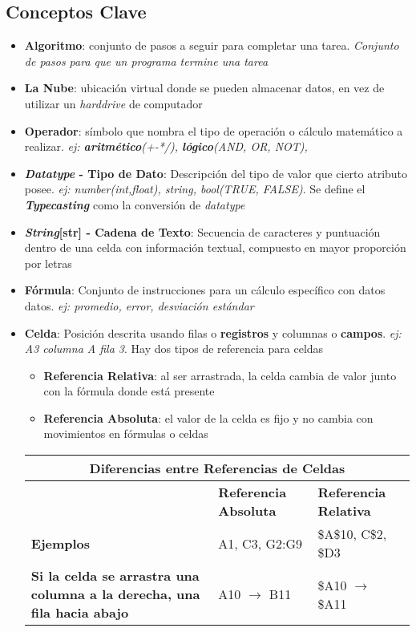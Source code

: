 \subsection{Conceptos Clave}
\begin{itemize}
    \item {\textbf{Algoritmo}: conjunto de pasos a seguir para completar una tarea. \textit{Conjunto de pasos para que un programa termine una tarea}}
    \item {\textbf{La Nube}: ubicación virtual donde se pueden almacenar datos, en vez de utilizar un \textit{harddrive} de computador}
    \item {\textbf{Operador}: símbolo que nombra el tipo de operación o cálculo matemático a realizar. \textit{ej: \textbf{aritmético}(+-*/), \textbf{lógico}(AND, OR, NOT), }}
    \item {\textbf{\textit{Datatype} - Tipo de Dato}: Descripción del tipo de valor que cierto atributo posee. \textit{ej: number(int,float), string, bool(TRUE, FALSE)}. Se define el \textbf{\textit{Typecasting}} como la conversión de \textit{datatype}}
    \item {\textbf{\textit{String}[str] - Cadena de Texto}: Secuencia de caracteres y puntuación dentro de una celda con información textual, compuesto en mayor proporción por letras}
    \item {\textbf{Fórmula}: Conjunto de instrucciones para un cálculo específico con datos datos. \textit{ej: promedio, error, desviación estándar}}
    \item {\textbf{Celda}: Posición descrita usando filas o \textbf{registros} y columnas o \textbf{campos}. \textit{ej: A3 columna A fila 3}. Hay dos tipos de referencia para celdas
    \begin{itemize}
        \item {\textbf{Referencia Relativa}: al ser arrastrada, la celda cambia de valor junto con la fórmula donde está presente}
        \item {\textbf{Referencia Absoluta}: el valor de la celda es fijo y no cambia con movimientos en fórmulas o celdas}
    \end{itemize}
    \begin{table}
            \centering
            \begin{tabular}{|p{5cm}|p{4.5cm}|p{4.5cm}|}
                \hline
                \multicolumn{3}{|c|}{Diferencias entre Referencias de Celdas} \\
                \hline
                & \textbf{Referencia Absoluta} & \textbf{Referencia Relativa} \\
                \hline
                \textbf{Ejemplos} & A1, C3, G2:G9 & \$A\$10, C\$2, \$D3 \\
                \hline
                \textbf{Si la celda se arrastra una columna a la derecha, una fila hacia abajo} & A10 $\rightarrow$ B11 & \$A10 $\rightarrow$ \$A11 \\
                \hline
            \end{tabular}
        \end{table}}
\end{itemize}


